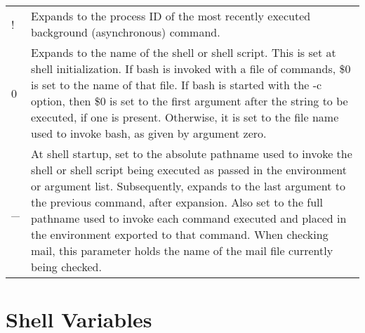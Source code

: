 \documentclass[11pt]{article}
\begin{document}
\begin{longtable}{p{}p{}}
! &

Expands to the process ID of the most recently executed background (asynchronous) command. \\

0 &

Expands to the name of the shell or shell script. This is set at shell initialization. If bash is invoked with a file of commands, \$0 is set to the name of that file. If bash is started with the -c option, then \$0 is set to the first argument after the string to be executed, if one is present. Otherwise, it is set to the file name used to invoke bash, as given by argument zero. \\

\_ &

At shell startup, set to the absolute pathname used to invoke the shell or shell script being executed as passed in the environment or argument list. Subsequently, expands to the last argument to the previous command, after expansion. Also set to the full pathname used to invoke each command executed and placed in the environment exported to that command. When checking mail, this parameter holds the name of the mail file currently being checked. \\

\end{longtable}

\section{Shell Variables}\label{sec:shellvariables}
\end{document}
